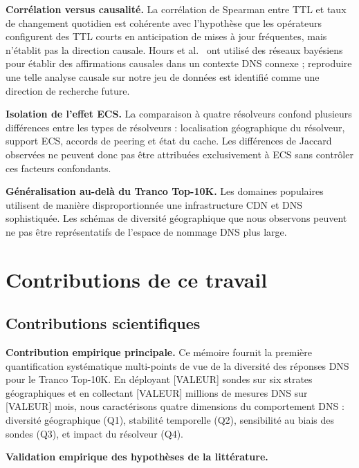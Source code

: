 \textbf{Corrélation versus causalité.}
La corrélation de Spearman entre TTL et taux de changement quotidien est cohérente avec l'hypothèse que les opérateurs configurent des TTL courts en anticipation de mises à jour fréquentes, mais n'établit pas la direction causale. Hours et al.~\cite{Hours2016} ont utilisé des réseaux bayésiens pour établir des affirmations causales dans un contexte DNS connexe ; reproduire une telle analyse causale sur notre jeu de données est identifié comme une direction de recherche future.

\textbf{Isolation de l'effet ECS.}
La comparaison à quatre résolveurs confond plusieurs différences entre les types de résolveurs : localisation géographique du résolveur, support ECS, accords de peering et état du cache. Les différences de Jaccard observées ne peuvent donc pas être attribuées exclusivement à ECS sans contrôler ces facteurs confondants.

\textbf{Généralisation au-delà du Tranco Top-10K.}
Les domaines populaires utilisent de manière disproportionnée une infrastructure CDN et DNS sophistiquée. Les schémas de diversité géographique que nous observons peuvent ne pas être représentatifs de l'espace de nommage DNS plus large.
\bigskip
\section{Contributions de ce travail}
\label{sec:5.3}

\subsection{Contributions scientifiques}
\label{subsec:5.3.1}

\textbf{Contribution empirique principale.}
Ce mémoire fournit la première quantification systématique multi-points de vue de la diversité des réponses DNS pour le Tranco Top-10K. En déployant [VALEUR] sondes sur six strates géographiques et en collectant [VALEUR] millions de mesures DNS sur [VALEUR] mois, nous caractérisons quatre dimensions du comportement DNS : diversité géographique (Q1), stabilité temporelle (Q2), sensibilité au biais des sondes (Q3), et impact du résolveur (Q4).

\textbf{Validation empirique des hypothèses de la littérature.}

